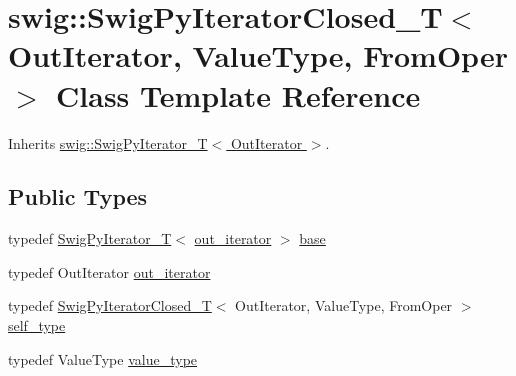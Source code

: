 \hypertarget{classswig_1_1_swig_py_iterator_closed___t}{}\section{swig\+:\+:Swig\+Py\+Iterator\+Closed\+\_\+T$<$ Out\+Iterator, Value\+Type, From\+Oper $>$ Class Template Reference}
\label{classswig_1_1_swig_py_iterator_closed___t}


Inherits \hyperlink{classswig_1_1_swig_py_iterator___t}{swig\+::\+Swig\+Py\+Iterator\+\_\+\+T$<$ Out\+Iterator $>$}.

\subsection*{Public Types}
\begin{DoxyCompactItemize}
\item 
typedef \hyperlink{classswig_1_1_swig_py_iterator___t}{Swig\+Py\+Iterator\+\_\+T}$<$ \hyperlink{classswig_1_1_swig_py_iterator___t_aec35545038c3d804975a147253f061e4}{out\+\_\+iterator} $>$ \hyperlink{classswig_1_1_swig_py_iterator_closed___t_a7a4e72c91ddb0aa9a92484d20c260ee8}{base}
\item 
typedef Out\+Iterator \hyperlink{classswig_1_1_swig_py_iterator_closed___t_ad1905c1ed0b2c2cb975788b82df5dba7}{out\+\_\+iterator}
\item 
typedef \hyperlink{classswig_1_1_swig_py_iterator_closed___t}{Swig\+Py\+Iterator\+Closed\+\_\+T}$<$ Out\+Iterator, Value\+Type, From\+Oper $>$ \hyperlink{classswig_1_1_swig_py_iterator_closed___t_a37a58d5b5c7a26f9345246d781e7edd4}{self\+\_\+type}
\item 
typedef Value\+Type \hyperlink{classswig_1_1_swig_py_iterator_closed___t_adff468d976862d52fa259857d5a30dba}{value\+\_\+type}
\end{DoxyCompactItemize}
